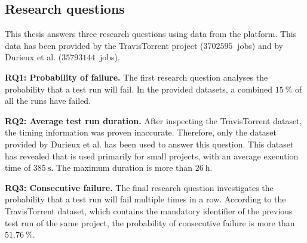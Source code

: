 \subsection{Research questions}
\noindent This thesis answers three research questions using data from the \travisci{} platform. This data has been provided by the TravisTorrent project \cite{msr17challenge} ($\SI{3702595}{}$ jobs) and by Durieux et al. \cite{travisanalysis} ($\SI{35793144}{}$ jobs).

\noindent \textbf{RQ1: Probability of failure.}
The first research question analyses the probability that a test run will fail. In the provided datasets, a combined $\SI{15}{\percent}$ of all the runs have failed.

\noindent \textbf{RQ2: Average test run duration.}
After inspecting the TravisTorrent dataset, the timing information was proven inaccurate. Therefore, only the dataset provided by Durieux et al. has been used to answer this question. This dataset has revealed that \travisci{} is used primarily for small projects, with an average execution time of $\SI{385}{\second}$. The maximum duration is more than $\SI{26}{\hour}$.

\noindent \textbf{RQ3: Consecutive failure.}
The final research question investigates the probability that a test run will fail multiple times in a row. According to the TravisTorrent dataset, which contains the mandatory identifier of the previous test run of the same project, the probability of consecutive failure is more than $\SI{51.76}{\percent}$.
